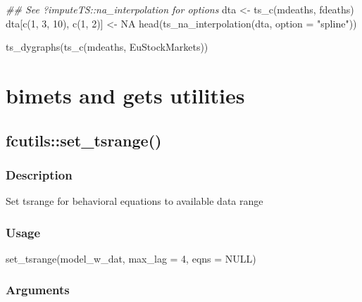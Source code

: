 \documentclass[
  letterpaper,
  DIV=11,
  numbers=noendperiod]{scrreport}
\newenvironment{Shaded}{\begin{snugshade}}{\end{snugshade}}
\newcommand{\AttributeTok}[1]{\textcolor[rgb]{0.40,0.45,0.13}{#1}}
\newcommand{\ConstantTok}[1]{\textcolor[rgb]{0.56,0.35,0.01}{#1}}
\newcommand{\DecValTok}[1]{\textcolor[rgb]{0.68,0.00,0.00}{#1}}
\newcommand{\DocumentationTok}[1]{\textcolor[rgb]{0.37,0.37,0.37}{\textit{#1}}}
\newcommand{\FunctionTok}[1]{\textcolor[rgb]{0.28,0.35,0.67}{#1}}
\newcommand{\NormalTok}[1]{\textcolor[rgb]{0.00,0.23,0.31}{#1}}
\newcommand{\OtherTok}[1]{\textcolor[rgb]{0.00,0.23,0.31}{#1}}
\newcommand{\StringTok}[1]{\textcolor[rgb]{0.13,0.47,0.30}{#1}}
\begin{document}
\begin{Shaded}
\begin{Highlighting}[]
\DocumentationTok{\#\# See ?imputeTS::na\_interpolation for options}
\NormalTok{dta }\OtherTok{\textless{}{-}} \FunctionTok{ts\_c}\NormalTok{(mdeaths, fdeaths)}
\NormalTok{dta[}\FunctionTok{c}\NormalTok{(}\DecValTok{1}\NormalTok{, }\DecValTok{3}\NormalTok{, }\DecValTok{10}\NormalTok{), }\FunctionTok{c}\NormalTok{(}\DecValTok{1}\NormalTok{, }\DecValTok{2}\NormalTok{)] }\OtherTok{\textless{}{-}} \ConstantTok{NA}
\FunctionTok{head}\NormalTok{(}\FunctionTok{ts\_na\_interpolation}\NormalTok{(dta, }\AttributeTok{option =} \StringTok{"spline"}\NormalTok{))}

\FunctionTok{ts\_dygraphs}\NormalTok{(}\FunctionTok{ts\_c}\NormalTok{(mdeaths, EuStockMarkets))}
\end{Highlighting}
\end{Shaded}

\section{bimets and gets utilities}\label{bimets-and-gets-utilities}

\subsection{fcutils::set\_tsrange()}\label{fcutilsset_tsrange}

\subsubsection{Description}\label{description-84}

Set tsrange for behavioral equations to available data range

\subsubsection{Usage}\label{usage-84}

\begin{Shaded}
\begin{Highlighting}[]
\FunctionTok{set\_tsrange}\NormalTok{(model\_w\_dat, }\AttributeTok{max\_lag =} \DecValTok{4}\NormalTok{, }\AttributeTok{eqns =} \ConstantTok{NULL}\NormalTok{)}
\end{Highlighting}
\end{Shaded}

\subsubsection{Arguments}\label{arguments-84}
\end{document}

